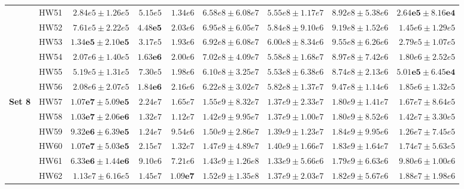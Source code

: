 \documentclass[pdflatex]{sn-jnl}
\begin{document}
\begin{table}
\begin{tabular}{l|r|r|r|r|r|r|r|r}
& HW51 & $2.84e5 \pm 1.26e5$ & $5.15e5$ & $1.34e6$
& $6.58e8 \pm 6.08e7$
& $5.55e8 \pm 1.17e7$
& $8.92e8 \pm 5.38e6$
& $\mathbf{2.64e5 \pm 8.16e4}$ \\

& HW52 & $7.61e5 \pm 2.22e5$ & $\mathbf{4.48e5}$ & $2.03e6$
& $6.95e8 \pm 6.05e7$
& $5.84e8 \pm 9.10e6$
& $9.19e8 \pm 1.52e6$
& $1.45e6 \pm 1.29e5$ \\

& HW53 & $\mathbf{1.34e5 \pm 2.10e5}$ & $3.17e5$ & $1.93e6$
& $6.92e8 \pm 6.08e7$
& $6.00e8 \pm 8.34e6$
& $9.55e8 \pm 6.26e6$
& $2.79e5 \pm 1.07e5$ \\

& HW54 & $2.07e6 \pm 1.40e5$ & $\mathbf{1.63e6}$ & $2.00e6$
& $7.02e8 \pm 4.09e7$
& $5.58e8 \pm 1.68e7$
& $8.97e8 \pm 7.42e6$
& $1.80e6 \pm 2.52e5$ \\

& HW55 & $5.19e5 \pm 1.31e5$ & $7.30e5$ & $1.98e6$
& $6.10e8 \pm 3.25e7$
& $5.53e8 \pm 6.38e6$
& $8.74e8 \pm 2.13e6$
& $\mathbf{5.01e5 \pm 6.45e4}$ \\

& HW56 & $2.08e6 \pm 2.07e5$ & $\mathbf{1.84e6}$ & $2.16e6$
& $6.22e8 \pm 3.02e7$
& $5.82e8 \pm 1.37e7$
& $9.47e8 \pm 1.14e6$
& $1.85e6 \pm 1.32e5$ \\
\hline

\multirow{8}{*}{\textbf{Set 8}}
& HW57 & $\mathbf{1.07e7 \pm 5.09e5}$ & $2.24e7$ & $1.65e7$
& $1.55e9 \pm 8.32e7$
& $1.37e9 \pm 2.33e7$
& $1.80e9 \pm 1.41e7$
& $1.67e7 \pm 8.64e5$ \\

& HW58 & $\mathbf{1.03e7 \pm 2.06e6}$ & $1.32e7$ & $1.12e7$
& $1.42e9 \pm 9.95e7$
& $1.37e9 \pm 1.00e7$
& $1.80e9 \pm 8.52e6$
& $1.42e7 \pm 3.30e5$ \\

& HW59 & $\mathbf{9.32e6 \pm 6.39e5}$ & $1.24e7$ & $9.54e6$
& $1.50e9 \pm 2.86e7$
& $1.39e9 \pm 1.23e7$
& $1.84e9 \pm 9.95e6$
& $1.26e7 \pm 7.45e5$ \\

& HW60 & $\mathbf{1.07e7 \pm 5.03e5}$ & $2.15e7$ & $1.32e7$
& $1.47e9 \pm 4.89e7$
& $1.40e9 \pm 1.66e7$
& $1.83e9 \pm 1.64e7$
& $1.74e7 \pm 5.63e5$ \\

& HW61 & $\mathbf{6.33e6 \pm 1.44e6}$ & $9.10e6$ & $7.21e6$
& $1.43e9 \pm 1.26e8$
& $1.33e9 \pm 5.66e6$
& $1.79e9 \pm 6.63e6$
& $9.80e6 \pm 1.00e6$ \\

& HW62 & $1.13e7 \pm 6.16e5$ & $1.45e7$ & $\mathbf{1.09e7}$
& $1.52e9 \pm 1.35e8$
& $1.37e9 \pm 2.03e7$
& $1.82e9 \pm 5.67e6$
& $1.88e7 \pm 1.98e6$ \\


\end{tabular}
\end{table}
\end{document}
